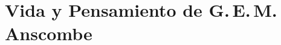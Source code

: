 \documentclass[../main.tex]{subfiles}
\begin{document}
\setcounter{chapter}{1}

\chapter{Vida y Pensamiento de G.\,E.\,M.\,Anscombe}






\end{document}
